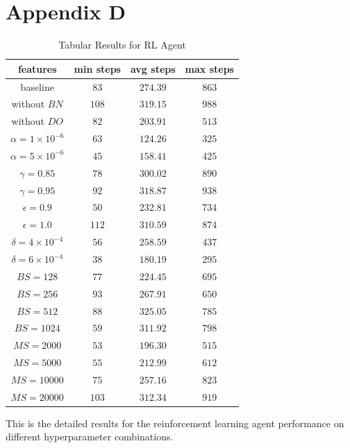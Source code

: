 \documentclass[letterpaper]{article} %
\begin{document}
  \section{Appendix D}
  \begin{table}[h!]
    \centering
    \normalsize{
      \begin{spacing}{1.9}
      \begin{tabular}{ |cccc| } 
        \hline
        features & min steps & avg steps & max steps  \\ 
        \hline
        \hline
        baseline & $83$& $274.39$ & $863$\\
        without $BN$&$108$&$319.15$&$988$\\
        without $DO$&$82$&$203.91$&$513$\\
        $\alpha=1\times 10^{-6}$&$63$&$124.26$&$325$\\
        $\alpha=5\times 10^{-6}$&$45$&$158.41$&$425$\\
        $\gamma=0.85$&$78$&$300.02$&$890$\\
        $\gamma=0.95$&$92$&$318.87$&$938$\\
        $\epsilon=0.9$&$50$&$232.81$&$734$\\
        $\epsilon=1.0$&$112$&$310.59$&$874$\\
        $\delta= 4\times 10^{-4}$&$56$&$258.59$&$437$\\
        $\delta= 6\times 10^{-4}$&$38$&$180.19$&$295$\\
        $BS=128$&$77$&$224.45$&$695$\\
        $BS=256$&$93$&$267.91$&$650$\\
        $BS=512$&$88$&$325.05$&$785$\\
        $BS=1024$&$59$&$311.92$&$798$\\
        $MS=2000$&$53$&$196.30$&$515$\\
        $MS=5000$&$55$&$212.99$&$612$\\
        $MS=10000$&$75$&$257.16$&$823$\\
        $MS=20000$&$103$&$312.34$&$919$\\
        \hline
      \end{tabular}
    \end{spacing}
    }
    \caption{Tabular Results for RL Agent}
    \medskip
    \footnotesize
    This is the detailed results for the reinforcement learning agent performance on different hyperparameter combinations.
    \label{tab:tabularResult}
  \end{table}  
  \newpage
\end{document}
